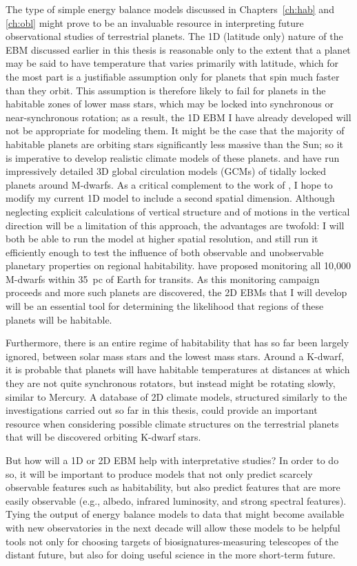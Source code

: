 The type of simple energy balance models discussed in
Chapters~\ref{ch:hab} and \ref{ch:obl} might prove to be an invaluable
resource in interpreting future observational studies of terrestrial
planets.  The 1D (latitude only) nature of the EBM discussed earlier
in this thesis is reasonable only to the extent that a planet may be
said to have temperature that varies primarily with latitude, which
for the most part is a justifiable assumption only for planets that
spin much faster than they orbit.  This assumption is therefore likely
to fail for planets in the habitable zones of lower mass stars, which
may be locked into synchronous or near-synchronous rotation; as a
result, the 1D EBM I have already developed will not be appropriate
for modeling them.  It might be the case that the majority of
habitable planets are orbiting stars significantly less massive than
the Sun; so it is imperative to develop realistic climate models of
these planets.  \citet{joshi_et_al1997} and \citet{joshi2003} have run
impressively detailed 3D global circulation models (GCMs) of tidally
locked planets around M-dwarfs.  As a critical complement to the work
of \citet{joshi2003}, I hope to modify my current 1D model to include
a second spatial dimension.  Although neglecting explicit calculations
of vertical structure and of motions in the vertical direction will be
a limitation of this approach, the advantages are twofold: I will both
be able to  run the model at higher spatial resolution, and
 still run it efficiently enough to test the influence of both
observable and unobservable planetary properties on regional
habitability.  \citet{charbonneau+deming2007} have proposed monitoring
all 10,000 M-dwarfs within 35~pc of Earth for transits.  As this
monitoring campaign proceeds and more such planets are discovered, the
2D EBMs that I will develop will be an essential tool for determining
the likelihood that regions of these planets will be habitable.

Furthermore, there is an entire regime of habitability that has so far
been largely ignored, between solar mass stars and the lowest mass
stars.  Around a K-dwarf, it is probable that planets will have
habitable temperatures at distances at which they are not quite
synchronous rotators, but instead might be rotating slowly, similar to
Mercury.  A database of 2D climate models, structured similarly to the
investigations carried out so far in this thesis, could provide an
important resource when considering possible climate structures on the
terrestrial planets that will be discovered orbiting K-dwarf stars.

But how will a 1D or 2D EBM help with interpretative studies?  In
order to do so, it will be important to produce models that not only
predict scarcely observable features such as habitability, but also
predict features that are more easily observable (e.g., albedo,
infrared luminosity, and strong spectral features).  Tying the output
of energy balance models to data that might become available with new
observatories in the next decade will allow these models to be helpful
tools not only for choosing targets of biosignatures-measuring
telescopes of the distant future, but also for doing useful science in
the more short-term future.

\cleardoublepage
